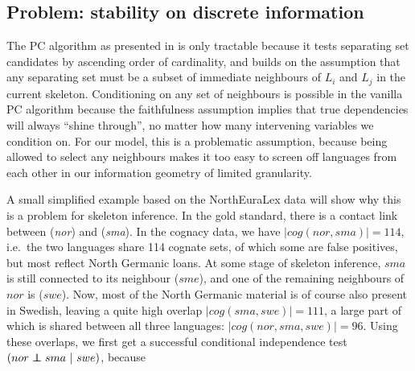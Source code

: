 \subsection{Problem: stability on discrete information}
The PC algorithm as presented in  is only tractable because it tests separating set candidates by ascending order of cardinality, and builds on the assumption that any separating set must be a subset of immediate neighbours of $L_i$ and $L_j$ in the current skeleton. Conditioning on any set of neighbours is possible in the vanilla PC algorithm because the faithfulness assumption implies that true dependencies will always ``shine through'', no matter how many intervening variables we condition on. For our model, this is a problematic assumption, because being allowed to select any neighbours makes it too easy to screen off languages from each other in our information geometry of limited granularity.

A small simplified example based on the NorthEuraLex data will show why this is a problem for skeleton inference. In the gold standard, there is a contact link between  (\textit{nor}) and  (\textit{sma}). In the cognacy data, we have $|cog(nor,sma)| = 114$, i.e.\ the two languages share 114 cognate sets, of which some are false positives, but most reflect North Germanic loans. At some stage of skeleton inference, $sma$ is still connected to its neighbour  ($sme$), and one of the remaining neighbours of $nor$ is  ($swe$). Now, most of the North Germanic material is of course also present in Swedish, leaving a quite high overlap $|cog(sma,swe)| = 111$, a large part of which is shared between all three languages: $|cog(nor,sma,swe)| = 96$. Using these overlaps, we first get a successful conditional independence test $(nor \indep sma\ |\ swe)$, because



